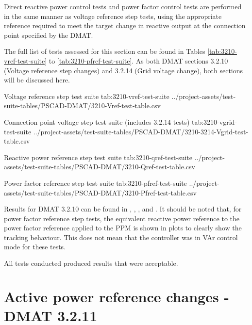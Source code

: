 \documentclass{../grid-link-report}
\newcommand{\projectassetsdir}{../project-assets}
\begin{document}
	Direct reactive power control tests and power factor control tests are performed in the same manner as voltage reference step tests, using the appropriate reference required to meet the target change in reactive output at the connection point specified by the \ac{DMAT}.
	
	The full list of tests assessed for this section can be found in Tables \ref{tab:3210-vref-test-suite} to \ref{tab:3210-pfref-test-suite}. As both DMAT sections 3.2.10 (Voltage reference step changes) and 3.2.14 (Grid voltage change), both sections will be discussed here.
	
	{
		\fontsize{7}{9}\selectfont
		\autoscaledlongtable
		{Voltage reference step test suite}
		{tab:3210-vref-test-suite}
		{\projectassetsdir/test-suite-tables/PSCAD-DMAT/3210-Vref-test-table.csv}
	}
	
	{
		\fontsize{7}{9}\selectfont
		\autoscaledlongtable
		{Connection point voltage step test suite (includes 3.2.14 tests)}
		{tab:3210-vgrid-test-suite}
		{\projectassetsdir/test-suite-tables/PSCAD-DMAT/3210-3214-Vgrid-test-table.csv}
	}
	
	
	{
		\fontsize{7}{9}\selectfont
		\autoscaledlongtable
		{Reactive power reference step test suite}
		{tab:3210-qref-test-suite}
		{\projectassetsdir/test-suite-tables/PSCAD-DMAT/3210-Qref-test-table.csv}
	}
	
	{
		\fontsize{7}{9}\selectfont
		\autoscaledlongtable
		{Power factor reference step test suite}
		{tab:3210-pfref-test-suite}
		{\projectassetsdir/test-suite-tables/PSCAD-DMAT/3210-Pfref-test-table.csv}
	}
	
	Results for DMAT 3.2.10 can be found in , , , and . It should be noted that, for power factor reference step tests, the equivalent reactive power reference to the power factor reference applied to the \ac{PPM} is shown in plots to clearly show the tracking behaviour. This does not mean that the controller was in VAr control mode for these tests.
	
	All tests conducted produced results that were acceptable.
	
	
	\section{Active power reference changes - DMAT 3.2.11}	
	\label{sec:pref-step-tests}
	
\end{document}
